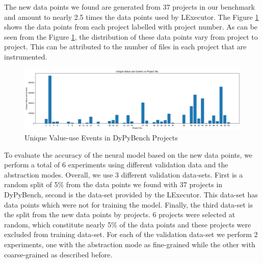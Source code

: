 The new data points we found are generated from 37 projects in our benchmark and amount to nearly 2.5 times the data points used by LExecutor.
The Figure \ref{fig:Lex_projects_events} shows the data points from each project labelled with project number.
As can be seen from the Figure \ref{fig:Lex_projects_events}, the distribution of these data points vary from project to project.
This can be attributed to the number of files in each project that are instrumented. 
\begin{figure}[ht]
    \centering
    \includegraphics[width=1\linewidth]{figures/evaluation/lex_data_points.png}
    \caption[Unique Value-use Events]{\label{fig:Lex_projects_events}Unique Value-use Events in DyPyBench Projects}
\end{figure}

To evaluate the accuracy of the neural model based on the new data points, we perform a total of 6 experiments using different validation data and the abstraction modes.
Overall, we use 3 different validation data-sets.
First is a random split of 5\% from the data points we found with 37 projects in DyPyBench, second is the data-set provided by the LExecutor. This data-set has data points which were not for training the model.
Finally, the third data-set is the split from the new data points by projects. 6 projects were selected at random, which constitute nearly 5\% of the data points and these projects were excluded from 
training data-set.
For each of the validation data-set we perform 2 experiments, one with the abstraction mode as fine-grained while the other with coarse-grained as described before.

